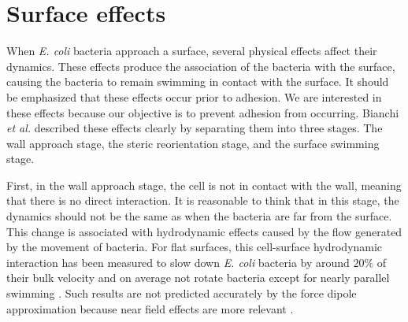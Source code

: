 \section{Surface effects}
\label{section:surface effects}



When \textit{E. coli} bacteria approach a surface, several physical effects affect their dynamics. These effects produce the association of the bacteria with the surface, causing the bacteria to remain swimming in contact with the surface. It should be emphasized that these effects occur prior to adhesion. We are interested in these effects because our objective is to prevent adhesion from occurring. Bianchi \textit{et al.} \cite{Bianchi2017HolographicBacteria} described these effects clearly by separating them into three stages. The wall approach stage, the steric reorientation stage, and the surface swimming stage.

First, in the wall approach stage, the cell is not in contact with the wall, meaning that there is no direct interaction. It is reasonable to think that in this stage, the dynamics should not be the same as when the bacteria are far from the surface. This change is associated with hydrodynamic effects caused by the flow generated by the movement of bacteria. For flat surfaces, this cell-surface hydrodynamic interaction has been measured to slow down \textit{E. coli} bacteria by around $20\%$ of their bulk velocity and on average not rotate bacteria except for nearly parallel swimming \cite{Bianchi2017HolographicBacteria}. Such results are not predicted accurately by the force dipole approximation because near field effects are more relevant \cite{Drescher2011FluidScattering}. 


